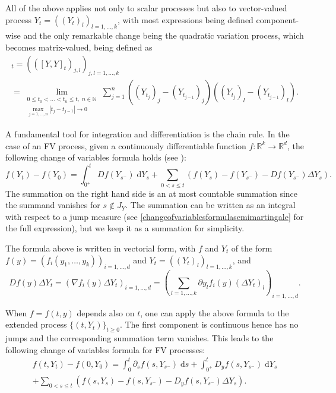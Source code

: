 \documentclass[reqno,12pt]{amsart}
\theoremstyle{plain} %
\theoremstyle{definition} %
\begin{document}
All of the above applies not only to scalar processes but also to vector-valued process $Y_t = ((Y_t)_l)_{l=1, \ldots, k}$, with most expressions being defined component-wise and the only remarkable change being the quadratic variation process, which becomes matrix-valued, being defined as
\begin{multline*}
    [Y, Y]_t = (([Y, Y]_t)_{j,l})_{j,l=1,\ldots, k} \\
    = \lim_{\substack{0\leq t_0 < \ldots < t_n \leq t, \;n\in \mathbb{N} \\ \max_{j=1, \ldots, n}|t_j - t_{j-1}| \rightarrow 0}} \sum_{j=1}^n ((Y_{t_j})_j - (Y_{t_{j-1}})_j) ((Y_{t_j})_l - (Y_{t_{j-1}})_l).
\end{multline*}

A fundamental tool for integration and differentiation is the chain rule. In the case of an FV process, given a continuously differentiable function $f:\mathbb{R}^k \rightarrow \mathbb{R}^d$, the following change of variables formula holds (see \cite[Theorems II.31 and II.33]{Protter2005}):
\begin{equation}
    f(Y_t) - f(Y_0) = \int_{0^+}^t Df(Y_{s^-}) \;\mathrm{d}Y_s + \sum_{0 < s \leq t} \left( f(Y_s) - f(Y_{s^{-}}) - Df(Y_{s^-})\Delta Y_s\right).
\end{equation}
The summation on the right hand side is an at most countable summation since the summand vanishes for $s \notin J_{Y}$. The summation can be written as an integral with respect to a jump measure (see \cref{changeofvariablesformulasemimartingale} for the full expression), but we keep it as a summation for simplicity.

The formula above is written in vectorial form, with $f$ and $Y_t$ of the form $f(y)=(f_i(y_1, \ldots, y_k))_{i=1, \ldots, d}$ and $Y_t = ((Y_t)_l)_{l=1, \ldots, k}$, and
\[
    Df(y)\Delta Y_t = \left( \nabla f_i(y)\Delta Y_t\right)_{i=1, \ldots, d} = \left( \sum_{l=1, \ldots, k} \partial y_l f_i(y) (\Delta Y_t)_l \right)_{i=1, \ldots, d}.
\]

When $f=f(t, y)$ depends also on $t$, one can apply the above formula to the extended process $\{(t, Y_t)\}_{t\geq 0}$. The first component is continuous hence has no jumps and the corresponding summation term vanishes. This leads to the following change of variables formula for FV processes:
\begin{multline}
    \label{changeofvariablesformulacadlagfv}
    f(t, Y_t) - f(0, Y_0) = \int_0^t \partial_s f(s, Y_{s^-})\;\mathrm{d}s + \int_{0^+}^t D_y f(s, Y_{s^-}) \;\mathrm{d}Y_s \\
    + \sum_{0 < s \leq t} \left( f(s, Y_s) - f(s, Y_{s^{-}}) - D_y f(s, Y_{s^-})\Delta Y_s\right).
\end{multline}
\end{document}

